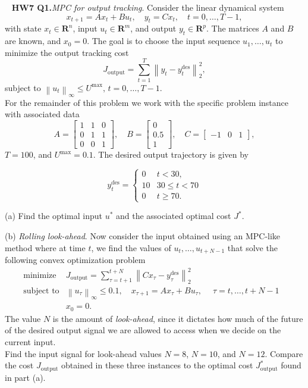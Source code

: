 \documentclass[12pt,reqno]{article}
\theoremstyle{definition}
\numberwithin{equation}{section}
\begin{document}
\noindent~\cite{EE364b} \textbf{HW7 Q1.}\textit{MPC for output tracking}.  Consider the linear dynamical system
    \[x_{t+1} = Ax_t + Bu_t, \quad y_t = Cx_t, \quad t = 0, \ldots, T-1,\]
    with state $x_t \in \mathbf{R}^n$, input $u_t \in \mathbf{R}^m$, and output $y_t \in \mathbf{R}^p$.
    The matrices $A$ and $B$ are known, and $x_0=0$. The goal is to choose the input sequence $u_1, \ldots, u_t$
    to minimize the output tracking cost
    \[J_{\text{output}} = \sum_{t=1}^{T}\left\lVert y_t - y_t^{\text{des}} \right\rVert_{2}^2,\]
    subject to $\left\lVert u_t \right\rVert_{\infty} \le U^{\text{max}}, \, t=0, \ldots, T-1$. \\
    For the remainder of this problem we work with the specific problem instance with associated data
    \[A = \begin{bmatrix}
        1 & 1 & 0 \\ 0 & 1 & 1 \\ 0 & 0 & 1
    \end{bmatrix}, \quad
    B = \begin{bmatrix}
        0 \\ 0.5 \\ 1
    \end{bmatrix}, \quad
    C = \begin{bmatrix}
        -1 & 0 & 1
    \end{bmatrix},\]
    $T=100$, and $U^{\text{max}} = 0.1$. The desired output trajectory is given by

    \[y^{\text{des}}_t = \begin{cases}
        0 & t < 30, \\
        10 & 30 \le t < 70 \\
        0 & t \ge 70.
    \end{cases}\]

    \noindent (a) Find the optimal input $u^*$ and the associated optimal cost $J^*$.
    
    \vspace{0.1cm}

    \noindent (b) \textit{Rolling look-ahead}. Now consider the input obtained using an MPC-like method
    where at time $t$, we find the values of $u_t, \ldots, u_{t+N-1}$ that solve the following convex optimization
    problem
    \[\begin{array}{lll}
        \text{minimize} \; & J_{\text{output}} =  \sum_{\tau=t+1}^{t+N}\left\lVert Cx_\tau - y_\tau^{\text{des}} \right\rVert_{2}^2 & \\
        \text{subject to} & \left\lVert u_\tau \right\rVert_{\infty} \le 0.1, \quad x_{\tau+1} = Ax_\tau + Bu_\tau, \; \quad \tau = t, \ldots, t + N - 1 & \\
        &x_0 = 0.
        \end{array}\]
    The value $N$ is the amount of \textit{look-ahead}, since it dictates how much of the future of the desired
    output signal we are allowed to access when we decide on the current input.\\
    Find the input signal for look-ahead values $N=8$, $N=10$, and $N=12$. Compare the cost $J_{\text{output}}$
    obtained in these three instances to the optimal cost $J_{\text{output}}^{*}$ found in part (a).
    
\end{document}
